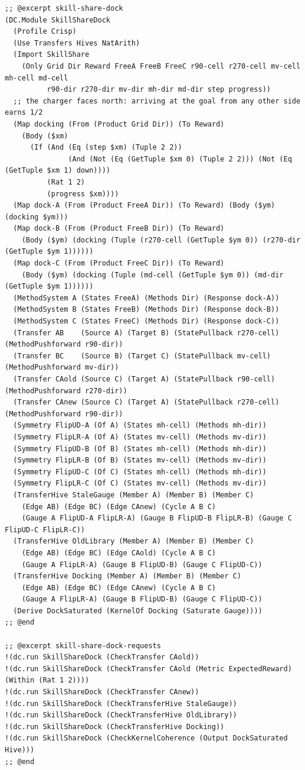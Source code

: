 \documentclass[11pt]{article}
\theoremstyle{definition}
\theoremstyle{plain}
\begin{document}
\begin{lstlisting}[style=mettafull]
;; @excerpt skill-share-dock
(DC.Module SkillShareDock
  (Profile Crisp)
  (Use Transfers Hives NatArith)
  (Import SkillShare
    (Only Grid Dir Reward FreeA FreeB FreeC r90-cell r270-cell mv-cell mh-cell md-cell
          r90-dir r270-dir mv-dir mh-dir md-dir step progress))
  ;; the charger faces north: arriving at the goal from any other side earns 1/2
  (Map docking (From (Product Grid Dir)) (To Reward)
    (Body ($xm)
      (If (And (Eq (step $xm) (Tuple 2 2))
               (And (Not (Eq (GetTuple $xm 0) (Tuple 2 2))) (Not (Eq (GetTuple $xm 1) down))))
          (Rat 1 2)
          (progress $xm))))
  (Map dock-A (From (Product FreeA Dir)) (To Reward) (Body ($ym) (docking $ym)))
  (Map dock-B (From (Product FreeB Dir)) (To Reward)
    (Body ($ym) (docking (Tuple (r270-cell (GetTuple $ym 0)) (r270-dir (GetTuple $ym 1))))))
  (Map dock-C (From (Product FreeC Dir)) (To Reward)
    (Body ($ym) (docking (Tuple (md-cell (GetTuple $ym 0)) (md-dir (GetTuple $ym 1))))))
  (MethodSystem A (States FreeA) (Methods Dir) (Response dock-A))
  (MethodSystem B (States FreeB) (Methods Dir) (Response dock-B))
  (MethodSystem C (States FreeC) (Methods Dir) (Response dock-C))
  (Transfer AB    (Source A) (Target B) (StatePullback r270-cell) (MethodPushforward r90-dir))
  (Transfer BC    (Source B) (Target C) (StatePullback mv-cell)   (MethodPushforward mv-dir))
  (Transfer CAold (Source C) (Target A) (StatePullback r90-cell)  (MethodPushforward r270-dir))
  (Transfer CAnew (Source C) (Target A) (StatePullback r270-cell) (MethodPushforward r90-dir))
  (Symmetry FlipUD-A (Of A) (States mh-cell) (Methods mh-dir))
  (Symmetry FlipLR-A (Of A) (States mv-cell) (Methods mv-dir))
  (Symmetry FlipUD-B (Of B) (States mh-cell) (Methods mh-dir))
  (Symmetry FlipLR-B (Of B) (States mv-cell) (Methods mv-dir))
  (Symmetry FlipUD-C (Of C) (States mh-cell) (Methods mh-dir))
  (Symmetry FlipLR-C (Of C) (States mv-cell) (Methods mv-dir))
  (TransferHive StaleGauge (Member A) (Member B) (Member C)
    (Edge AB) (Edge BC) (Edge CAnew) (Cycle A B C)
    (Gauge A FlipUD-A FlipLR-A) (Gauge B FlipUD-B FlipLR-B) (Gauge C FlipUD-C FlipLR-C))
  (TransferHive OldLibrary (Member A) (Member B) (Member C)
    (Edge AB) (Edge BC) (Edge CAold) (Cycle A B C)
    (Gauge A FlipLR-A) (Gauge B FlipUD-B) (Gauge C FlipUD-C))
  (TransferHive Docking (Member A) (Member B) (Member C)
    (Edge AB) (Edge BC) (Edge CAnew) (Cycle A B C)
    (Gauge A FlipLR-A) (Gauge B FlipUD-B) (Gauge C FlipUD-C))
  (Derive DockSaturated (KernelOf Docking (Saturate Gauge))))
;; @end

;; @excerpt skill-share-dock-requests
!(dc.run SkillShareDock (CheckTransfer CAold))
!(dc.run SkillShareDock (CheckTransfer CAold (Metric ExpectedReward) (Within (Rat 1 2))))
!(dc.run SkillShareDock (CheckTransfer CAnew))
!(dc.run SkillShareDock (CheckTransferHive StaleGauge))
!(dc.run SkillShareDock (CheckTransferHive OldLibrary))
!(dc.run SkillShareDock (CheckTransferHive Docking))
!(dc.run SkillShareDock (CheckKernelCoherence (Output DockSaturated Hive)))
;; @end


\end{lstlisting}
\end{document}
